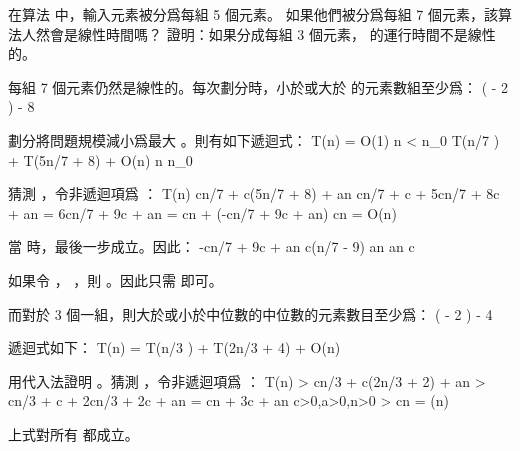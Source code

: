 \startsection[
  title={Selection in worst-case linear time},
  reference=section:linear_selection,
]

\startEXERCISE
在算法  中，輸入元素被分爲每組 5 個元素。
如果他們被分爲每組 7 個元素，該算法人然會是線性時間嗎？
證明：如果分成每組 3 個元素，  的運行時間不是線性的。
\stopEXERCISE

\startANSWER
每組 7 個元素仍然是線性的。每次劃分時，小於或大於  的元素數組至少爲：
 \left(\left\lceil {} \left\lceil {} \right\rceil \right\rceil
           - 2 \right) \ge {} - 8
\stopformula

劃分將問題規模減小爲最大 。則有如下遞迴式：
\startformula
T(n) = \startmathcases
 \NC O(1) \MC {} n < n_0 \NR
 \NC T(\lceil n/7 \rceil) + T(5n/7 + 8) + O(n) \MC {} n \ge n_0 \NR
\stopmathcases
\stopformula

猜測 ，令非遞迴項爲 ：
\startformula\startmathalignment
\NC T(n) \NC \le c\lceil n/7 \rceil + c(5n/7 + 8) + an \NR
\NC \NC \le cn/7 + c + 5cn/7 + 8c + an \NR
\NC \NC = 6cn/7 + 9c + an \NR
\NC \NC = cn + (-cn/7 + 9c + an) \NR
\NC \NC \le cn \NR
\NC \NC = O(n) \NR
\stopmathalignment\stopformula

當  時，最後一步成立。因此：
\startformula\startmathalignment[n=1]
\NC -cn/7 + 9c + an  \NR
\NC \Downarrow \NR
\NC c(n/7 - 9) \ge an \NR
\NC \Downarrow \NR
\NC {} \ge an \NR
\NC \Downarrow \NR
\NC c \ge {} \NR
\stopmathalignment\stopformula

如果令 ， ，則 。因此只需  即可。

而對於 3 個一組，則大於或小於中位數的中位數的元素數目至少爲：
 \left(\left\lceil {} \left\lceil {} \right\rceil \right\rceil
           - 2 \right) \ge {} - 4
\stopformula

遞迴式如下：
\startformula
T(n) = T(\lceil n/3 \rceil) + T(2n/3 + 4) + O(n)
\stopformula

用代入法證明 。猜測 ，令非遞迴項爲 ：
\startformula\startmathalignment
\NC T(n) \NC > c\lceil n/3 \rceil + c(2n/3 + 2) + an \NR
\NC \NC > cn/3 + c + 2cn/3 + 2c + an \NR
\NC \NC = cn + 3c + an \qquad c>0,a>0,n>0\NR
\NC \NC > cn \NR
\NC \NC = \omega(n) \NR
\stopmathalignment\stopformula

上式對所有  都成立。
\stopANSWER

